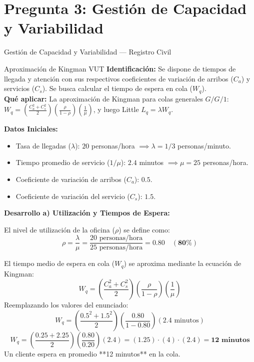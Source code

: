 \documentclass[11pt, a4paper]{article}
\begin{document}
\newpage

\section{Pregunta 3: Gestión de Capacidad y Variabilidad}

\begin{ejercicio}{Gestión de Capacidad y Variabilidad --- Registro Civil}
  \begin{tipprueba}{Aproximación de Kingman VUT}
    \textbf{Identificación:} Se dispone de tiempos de llegada y atención con sus respectivos coeficientes de variación de arribos ($C_a$) y servicios ($C_s$). Se busca calcular el tiempo de espera en cola ($W_q$). \\
    \textbf{Qué aplicar:} La aproximación de Kingman para colas generales $G/G/1$: $W_q = \left(\frac{C_a^2 + C_s^2}{2}\right) \left(\frac{\rho}{1-\rho}\right) \left(\frac{1}{\mu}\right)$, y luego Little $L_q = \lambda W_q$.
  \end{tipprueba}

  \textbf{Datos Iniciales:}
  \begin{itemize}
    \item Tasa de llegadas ($\lambda$): $20$ personas/hora $\implies \lambda = 1/3$ personas/minuto.
    \item Tiempo promedio de servicio ($1/\mu$): $2.4$ minutos $\implies \mu = 25$ personas/hora.
    \item Coeficiente de variación de arribos ($C_a$): $0.5$.
    \item Coeficiente de variación del servicio ($C_s$): $1.5$.
  \end{itemize}

  \medskip
  \textbf{Desarrollo a) Utilización y Tiempos de Espera:}

  El nivel de utilización de la oficina ($\rho$) se define como:
  \[
    \rho = \frac{\lambda}{\mu} = \frac{20 \text{ personas/hora}}{25 \text{ personas/hora}} = \mathbf{0.80 \quad (80\%)}
  \]

  El tiempo medio de espera en cola ($W_q$) se aproxima mediante la ecuación de Kingman:
  \[
    W_q = \left( \frac{C_a^2 + C_s^2}{2} \right) \left( \frac{\rho}{1 - \rho} \right) \left( \frac{1}{\mu} \right)
  \]
  Reemplazando los valores del enunciado:
  \[
    W_q = \left( \frac{0.5^2 + 1.5^2}{2} \right) \left( \frac{0.80}{1 - 0.80} \right) (2.4 \text{ minutos})
  \]
  \[
    W_q = \left( \frac{0.25 + 2.25}{2} \right) \left( \frac{0.80}{0.20} \right) (2.4) = (1.25) \cdot (4) \cdot (2.4) = \mathbf{12 \text{ minutos}}
  \]
  Un cliente espera en promedio **12 minutos** en la cola.


\end{ejercicio}
\end{document}

